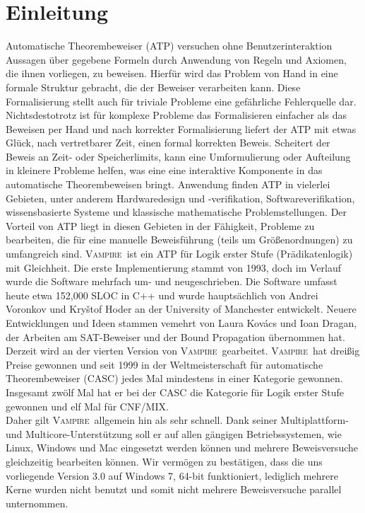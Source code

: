 \documentclass{article}
\newcommand{\vampire}{\textsc{Vampire}~}
\begin{document}
\section{Einleitung}
\label{sec:introduction}
Automatische Theorembeweiser (ATP) versuchen ohne Benutzerinteraktion Aussagen über gegebene Formeln durch Anwendung von Regeln und Axiomen, die ihnen vorliegen, zu beweisen.
Hierfür wird das Problem von Hand in eine formale Struktur gebracht, die der Beweiser verarbeiten kann.
Diese Formalisierung stellt auch für triviale Probleme eine gefährliche Fehlerquelle dar. 
Nichtsdestotrotz ist für komplexe Probleme das Formalisieren einfacher als das Beweisen per Hand und nach korrekter Formalisierung liefert der ATP mit etwas Glück, nach vertretbarer Zeit,
einen formal korrekten Beweis. Scheitert der Beweis an Zeit- oder Speicherlimits, kann eine
Umformulierung oder Aufteilung in kleinere Probleme helfen, was eine eine interaktive
Komponente in das automatische Theorembeweisen bringt.
Anwendung finden ATP in vielerlei Gebieten, unter anderem Hardwaredesign und -verifikation, Softwareverifikation, wissensbasierte Systeme und klassische mathematische Problemstellungen.
Der Vorteil von ATP liegt in diesen Gebieten in der Fähigkeit, Probleme zu bearbeiten, 
die für eine manuelle Beweisführung (teils um Größenordnungen) zu umfangreich sind.
\vampire ist ein ATP für Logik erster Stufe (Prädikatenlogik) mit Gleichheit. Die erste Implementierung stammt von 1993, doch im Verlauf wurde die Software mehrfach um- und neugeschrieben.
Die Software umfasst heute etwa 152,000 SLOC in C++ und wurde hauptsächlich von Andrei Voronkov und Kry{\v{s}}tof Hoder an der University of Manchester entwickelt.
Neuere Entwicklungen und Ideen stammen vemehrt von Laura Kov{\'a}cs und Ioan Dragan, der Arbeiten am SAT-Beweiser und der Bound Propagation übernommen hat.
Derzeit wird an der vierten Version von \vampire gearbeitet.
\vampire hat dreißig Preise gewonnen und seit 1999 in der Weltmeisterschaft für automatische Theorembeweiser (CASC) jedes Mal mindestens in einer Kategorie gewonnen.
Insgesamt zwölf Mal hat er bei der CASC die Kategorie für Logik erster Stufe gewonnen und elf Mal für CNF/MIX. ~\cite{vampirehp} \\ Daher gilt \vampire allgemein hin als sehr schnell.
Dank seiner Multiplattform- und Multicore-Unterstützung soll er auf allen gängigen Betriebssystemen, wie Linux, Windows und Mac eingesetzt werden können und mehrere Beweisversuche gleichzeitig bearbeiten können.
Wir vermögen zu bestätigen, dass die uns vorliegende Version 3.0 auf Windows 7, 64-bit funktioniert, lediglich mehrere Kerne wurden nicht benutzt und somit nicht mehrere Beweisversuche parallel unternommen.
\end{document}
